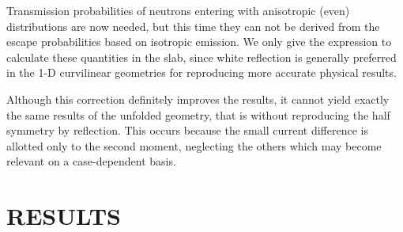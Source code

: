 \documentclass{ictt26}
\begin{document}
Transmission probabilities of neutrons entering with anisotropic (even) distributions are now needed, but this time they can not be derived from the escape probabilities based on isotropic emission. We only give the expression to calculate these quantities in the slab, since white reflection is generally preferred in the 1-D curvilinear geometries for reproducing more accurate physical results.

Although this correction definitely improves the results, it cannot yield exactly the same results of the unfolded geometry, that is without reproducing the half symmetry by reflection. This occurs because the small current difference is allotted only to the second moment, neglecting the others which may become relevant on a case-dependent basis.


\section{RESULTS}
\label{sec:res}
\end{document}
